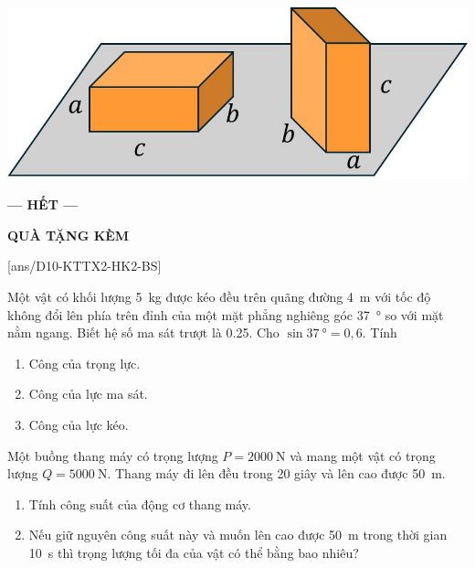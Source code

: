 \begin{ex}
	{\vspace{-0.5cm}\includegraphics[scale=0.4]{../figs/D10-KTTX2-HK2-4}}
\end{ex}
\begin{center}
	\textbf{--- HẾT ---}
\end{center}
\newpage
\begin{center}
	\textbf{\color{purple}QUÀ TẶNG KÈM \LARGE\smiley}
\end{center}
\setcounter{ex}{0}
[ans/D10-KTTX2-HK2-BS]
\begin{ex}
	Một vật có khối lượng \SI{5}{\kilogram} được kéo đều trên quãng đường \SI{4}{\meter} với tốc độ không đổi lên phía trên đỉnh của một mặt phẳng nghiêng góc \SI{37}{\degree} so với mặt nằm ngang. Biết hệ số ma sát trượt là \SI{0.25}{}. Cho $\sin\SI{37}{\degree}=0,6$. Tính
	\begin{enumerate}[label=\alph*)]
		\item Công của trọng lực.
		\item Công của lực ma sát.
		\item Công của lực kéo.
	\end{enumerate}
	\loigiai{
		
	}
\end{ex}
\begin{ex}
	Một buồng thang máy có trọng lượng $P=\SI{2000}{\newton}$ và mang một vật có trọng lượng $Q=\SI{5000}{\newton}$. Thang máy đi lên đều trong 20 giây và lên cao được \SI{50}{\meter}.
	\begin{enumerate}[label=\alph*)]
		\item Tính công suất của động cơ thang máy.
		\item Nếu giữ nguyên công suất này và muốn lên cao được \SI{50}{\meter} trong thời gian \SI{10}{\second} thì trọng lượng tối đa của vật có thể bằng bao nhiêu?
	\end{enumerate}
	\loigiai{
		
	}
\end{ex}
